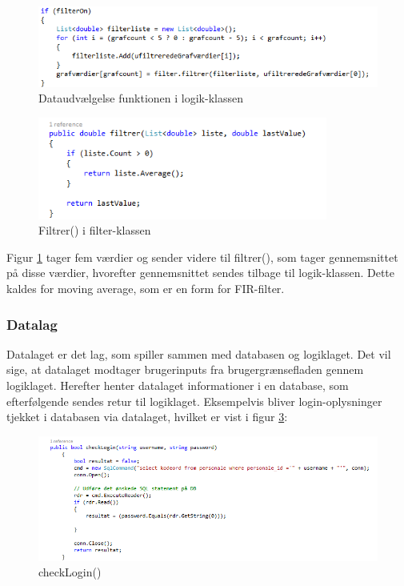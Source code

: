 \begin{figure}[H]
	\centering
	\includegraphics[width=1.15\textwidth]{Figurer/SoftwareImplementering/Filtrer1}
	\caption{Dataudvælgelse funktionen i logik-klassen}
	\label{Filtrer}
\end{figure}

\begin{figure}[H]
	\centering
	\includegraphics[width=0.85\textwidth]{Figurer/SoftwareImplementering/filtrer}
	\caption{Filtrer() i filter-klassen}
	\label{filtrer}
\end{figure}

Figur \ref{Filtrer} tager fem værdier og sender videre til filtrer(), som tager gennemsnittet på disse værdier, hvorefter gennemsnittet sendes tilbage til logik-klassen.
Dette kaldes for moving average, som er en form for FIR-filter.

\subsubsection{Datalag}\label{Datalag}
Datalaget er det lag, som spiller sammen med databasen og logiklaget. Det vil sige, at datalaget modtager brugerinputs fra brugergrænsefladen gennem logiklaget. Herefter henter datalaget informationer i en database, som efterfølgende sendes retur til logiklaget. Eksempelvis bliver login-oplysninger tjekket i databasen via datalaget, hvilket er vist i figur \ref{Datalogin}:

\begin{figure}[H]
	\centering
	\includegraphics[width=1.4\textwidth]{Figurer/SoftwareImplementering/CheckLogind}
	\caption{checkLogin()}
	\label{Datalogin}
\end{figure}


